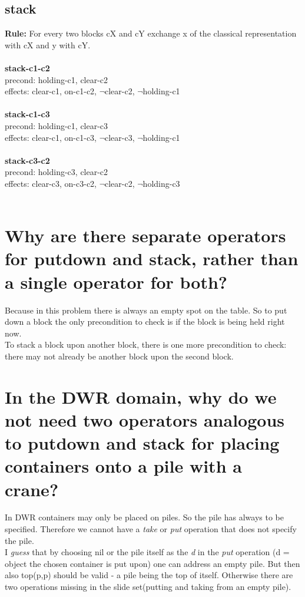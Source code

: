 \documentclass[paper=a4, fontsize=11pt]{scrartcl} %
\numberwithin{equation}{section} %
\numberwithin{figure}{section} %
\numberwithin{table}{section} %
\begin{document}
\subsection{stack}
\textbf{Rule:} For every two blocks cX and cY exchange x of the classical representation with cX and y with cY.\\\\

\textbf{stack-c1-c2}\\
precond: holding-c1, clear-c2\\
effects: clear-c1, on-c1-c2, $\lnot$clear-c2, $\lnot$holding-c1\\\\

\textbf{stack-c1-c3}\\
precond: holding-c1, clear-c3\\
effects: clear-c1, on-c1-c3, $\lnot$clear-c3, $\lnot$holding-c1\\\\

\textbf{stack-c3-c2}\\
precond: holding-c3, clear-c2\\
effects: clear-c3, on-c3-c2, $\lnot$clear-c2, $\lnot$holding-c3\\\\

\section{Why are there separate operators for putdown and stack, rather than a single operator for
both?}

Because in this problem there is always an empty spot on the table. So to put down a block the only precondition to check is if the block is being held right now.\\
To stack a block upon another block, there is one more precondition to check: there may not already be another block upon the second block.

\section{In the DWR domain, why do we not need two operators analogous to putdown and stack for placing containers onto a pile with a crane?}

In DWR containers may only be placed on piles. So the pile has always to be specified. Therefore we cannot have a \textit{take} or \textit{put} operation that does not specify the pile.\\
I \textit{guess} that by choosing nil or the pile itself as the \textit{d} in the \textit{put} operation (d = object the chosen container is put upon) one can address an empty pile. But then also top(p,p) should be valid - a pile being the top of itself. Otherwise there are two operations missing in the slide set(putting and taking from an empty pile).
\end{document}
